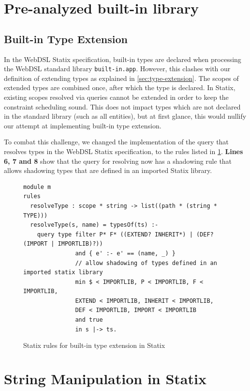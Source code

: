   \section{\label{sec:built-in-library}Pre-analyzed built-in library}

    \subsection{\label{subsec:built-in-extension}Built-in Type Extension}

      In the WebDSL Statix specification, built-in types are declared when processing the WebDSL standard library \texttt{built-in.app}. However, this clashes with our definition of extending types as explained in \cref{sec:type-extension}. The scopes of extended types are combined once, after which the type is declared. In Statix, existing scopes resolved via queries cannot be extended in order to keep the constraint scheduling sound. This does not impact types which are not declared in the standard library (such as all entities), but at first glance, this would nullify our attempt at implementing built-in type extension.

      To combat this challenge, we changed the implementation of the query that resolves types in the WebDSL Statix specification, to the rules listed in \cref{fig:built-in-type-extension-statix}. \textbf{Lines 6, 7 and 8} show that the query for resolving now has a shadowing rule that allows shadowing types that are defined in an imported Statix library.

      \begin{figure}
        \begin{verbatim}
module m
rules
  resolveType : scope * string -> list((path * (string * TYPE)))
  resolveType(s, name) = typesOf(ts) :-
    query type filter P* F* ((EXTEND? INHERIT*) | (DEF? (IMPORT | IMPORTLIB)?))
               and { e' :- e' == (name, _) }
               // allow shadowing of types defined in an imported statix library
               min $ < IMPORTLIB, P < IMPORTLIB, F < IMPORTLIB,
               EXTEND < IMPORTLIB, INHERIT < IMPORTLIB,
               DEF < IMPORTLIB, IMPORT < IMPORTLIB
               and true
               in s |-> ts.
        \end{verbatim}
        \caption{\label{fig:built-in-type-extension-statix}Statix rules for built-in type extension in Statix}
      \end{figure}

  \section{\label{sec:statix-string-manipulation}String Manipulation in Statix}
